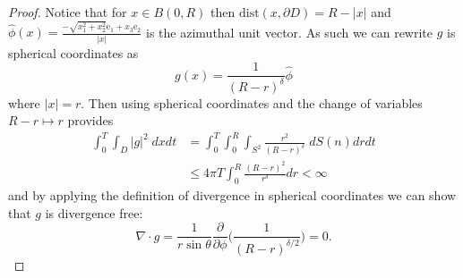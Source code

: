 \documentclass[10pt,a4paper]{amsart}
\def\dist{\mathrm{dist}}
\def\grad{\nabla}
\newcommand{\pd}[2]{\frac{\partial #1}{\partial #2}}
\begin{document}
\begin{proof}
    Notice that for $x \in B(0,R)$ then $\dist(x, \partial D) = R - |x|$ and $\widehat{\phi}(x) = \frac{-\sqrt{x_1^2 + x_2^2}\mathrm{e}_1 + x_3\mathrm{e}_2}{|x|}$ is the azimuthal unit vector. As such we can rewrite $g$ is spherical coordinates as 
    \[
        g(x) = \frac{1}{(R-r)^\delta}\widehat{\phi}
    \]
    where $|x| = r$. Then using spherical coordinates and the change of variables $R - r \mapsto r$ provides
    \begin{align*}
        \int_0^T\int_D|g|^2\;dxdt &= \int_0^T\int_0^R \int_{S^2}\frac{r^2}{(R - r)^\delta}\;dS(n)drdt\\
        &\leq 4\pi T\int_0^R \frac{(R-r)^2}{r^\delta}dr < \infty
    \end{align*}
    and by applying the definition of divergence in spherical coordinates we can show that $g$ is divergence free:
    \[
        \grad \cdot g = \frac{1}{r\sin\theta}\pd{}{\phi}\Big(\frac{1}{(R - r)^{\delta/2}}\Big)= 0. 
    \]
    

\end{proof}
\end{document}
